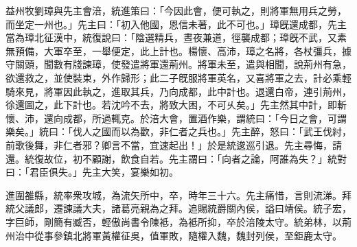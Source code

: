 \begin{pinyinscope}
 
益州牧劉璋與先主會涪，統進策曰：「今因此會，便可執之，則將軍無用兵之勞，而坐定一州也。」先主曰：「初入他國，恩信未著，此不可也。」璋旣還成都，先主當為璋北征漢中，統復說曰：「陰選精兵，晝夜兼道，徑襲成都；璋旣不武，又素無預備，大軍卒至，一舉便定，此上計也。楊懷、高沛，璋之名將，各杖彊兵，據守關頭，聞數有牋諫璋，使發遣將軍還荊州。將軍未至，遣與相聞，說荊州有急，欲還救之，並使裝束，外作歸形；此二子旣服將軍英名，又喜將軍之去，計必乘輕騎來見，將軍因此執之，進取其兵，乃向成都，此中計也。退還白帝，連引荊州，徐還圖之，此下計也。若沈吟不去，將致大困，不可乆矣。」先主然其中計，即斬懷、沛，還向成都，所過輒克。於涪大會，置酒作樂，謂統曰：「今日之會，可謂樂矣。」統曰：「伐人之國而以為歡，非仁者之兵也。」先主醉，怒曰：「武王伐紂，前歌後舞，非仁者邪？卿言不當，宜速起出！」於是統逡巡引退。先主尋悔，請還。統復故位，初不顧謝，飲食自若。先主謂曰：「向者之論，阿誰為失？」統對曰：「君臣俱失。」先主大笑，宴樂如初。
 
 
進圍雒縣，統率衆攻城，為流矢所中，卒，時年三十六。先主痛惜，言則流涕。拜統父議郎，遷諫議大夫，諸葛亮親為之拜。追賜統爵關內侯，謚曰靖侯。統子宏，字巨師，剛簡有臧否，輕傲尚書令陳袛，為袛所抑，卒於涪陵太守。統弟林，以荊州治中從事參鎮北將軍黃權征吳，值軍敗，隨權入魏，魏封列侯，至鉅鹿太守。
 
 
\end{pinyinscope}